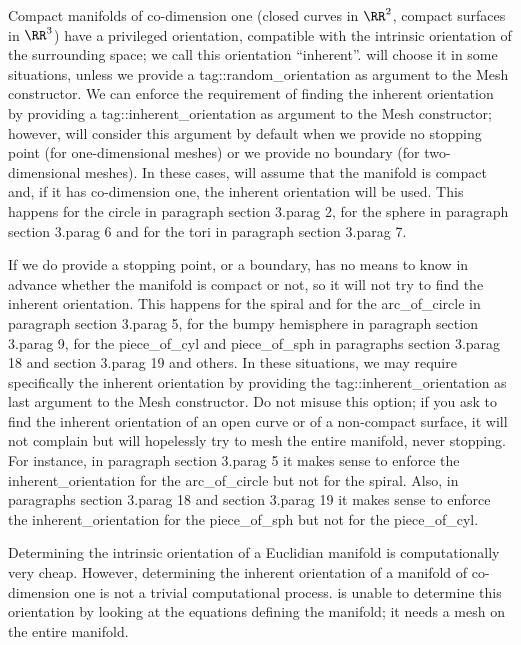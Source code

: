 Compact manifolds of co-dimension one (closed curves in $ \RR^2 $,
compact surfaces in $ \RR^3 $) have a privileged orientation,
compatible with the intrinsic orientation of the surrounding space;
we call this orientation ``inherent''.
{\ManiFEM} will choose it in some situations, unless we provide a
{\codett tag::random\_orientation} as argument to the {\codett Mesh} constructor.
We can enforce the requirement of finding the inherent orientation by providing a
{\codett tag::inherent\_orientation} as argument to the {\codett Mesh} constructor;
however, {\maniFEM} will consider this argument by default when we provide no stopping
point (for one-dimensional meshes) or we provide no boundary (for two-dimensional meshes).
In these cases, {\maniFEM} will assume that the manifold is compact and, if it has
co-dimension one, the inherent orientation will be used.
This happens for the {\codett circle} in paragraph \numb section 3.\numb parag 2,
for the {\codett sphere} in paragraph \numb section 3.\numb parag 6 and for the
{\codett tori} in paragraph \numb section 3.\numb parag 7.

If we do provide a stopping point, or a boundary, {\maniFEM} has no means to know in
advance whether the manifold
is compact or not, so it will not try to find the inherent orientation.
This happens for the {\codett spiral} and for the {\codett arc\_of\_circle} in paragraph
\numb section 3.\numb parag 5, for the {\codett bumpy} hemisphere in paragraph
\numb section 3.\numb parag 9, for the {\codett piece\_of\_cyl} and {\codett piece\_of\_sph}
in paragraphs \numb section 3.\numb parag 18 and \numb section 3.\numb parag 19 and others.
In these situations, we may require specifically the inherent orientation
by providing the {\codett tag::inherent\_orientation} as last argument to the
{\codett Mesh} constructor.
Do not misuse this option; if you ask {\maniFEM} to find the inherent orientation of an open
curve or of a non-compact surface, it will not complain but will hopelessly try to mesh
the entire manifold, never stopping.
For instance, in paragraph \numb section 3.\numb parag 5 it makes sense to enforce the
{\codett inherent\_orientation} for the {\codett arc\_of\_circle} but not for the
{\codett spiral}.
Also, in paragraphs \numb section 3.\numb parag 18 and \numb section 3.\numb parag 19
it makes sense to enforce the {\codett inherent\_orientation} for the
{\codett piece\_of\_sph} but not for the {\codett piece\_of\_cyl}.

Determining the intrinsic orientation of a Euclidian manifold is computationally
very cheap.
However, determining the inherent orientation of a manifold of co-dimension one is not
a trivial computational process.
{\ManiFEM} is unable to determine this orientation by looking at the equations defining
the manifold; it needs a mesh on the entire manifold.

